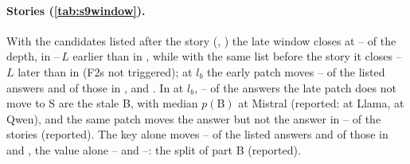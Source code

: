 \paragraph{Stories (\cref{tab:s9window}).} With the candidates listed after the story (\fmtListA{}, \fmtLetter{}) the late window closes at \NqLcFracListedMin{}--\NqLcFracListedMax{} of the depth, in \fmtListA{} \NqGapNoneAfterMin{}--\NqGapNoneAfterMax{}\,$L$ earlier than in \fmtNone{}, while with the same list before the story it closes \NqGapBeforeAfterMin{}--\NqGapBeforeAfterMax{}\,$L$ later than in \fmtListA{} (F2s not triggered); at $l_b$ the early patch moves \NqEarlyListedMin{}--\NqEarlyListedMax{} of the listed answers and \NqEarlyFreeMax{} of those in \fmtNone{}, \fmtBefore{} and \fmtNull{}. In \fmtListA{} at $l_b$, \NqSilentShareAfterMin{}--\NqSilentShareAfterMax{} of the answers the late patch does not move to S are the stale B, with median $p(\mathrm{B})$ \NqSilentPbAfterMistralSeven{} at Mistral (reported: \NqSilentPbAfterLlamaEight{} at Llama, \NqSilentPbAfterQwenSeven{} at Qwen), and the same patch moves the \fmtNone{} answer but not the \fmtListA{} answer in \NqInconsMin{}--\NqInconsMax{} of the stories (reported). The key alone moves \NqKzeroListedMin{}--\NqKzeroListedMax{} of the listed answers and \NqKzeroFreeMax{} of those in \fmtNone{} and \fmtBefore{}, the value alone \NqVzeroListedMin{}--\NqVzeroListedMax{} and \NqVzeroFreeMin{}--\NqVzeroFreeMax{}: the split of part B (reported).

